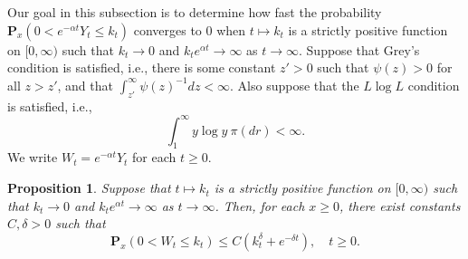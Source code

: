 \documentclass[12pt,a4paper]{amsart}
\theoremstyle{plain}
\newtheorem{prop}[thm]{Proposition}
\theoremstyle{definition}
\numberwithin{equation}{section}
\begin{document}
    Our goal in this subsection is to determine how fast the probability $\mathbf P_x(0<e^{-\alpha t}Y_t \leq k_t)$ converges to $0$
    when $t\mapsto k_t$ is a strictly positive function on $[0,\infty)$ such that $k_t \to 0$ and $k_t e^{\alpha t} \to \infty$ as $t\to \infty$.
    Suppose that Grey's condition is satisfied, i.e., there is some constant $z' > 0$ such that $\psi(z) > 0$ for all $z>z'$, and that $\int_{z'}^\infty \psi(z)^{-1}dz < \infty$.
    Also suppose that the $L \log L$ condition is satisfied, i.e.,
\[
    \int_1^\infty y \log y~\pi(dr)
    < \infty.
\]
    We write $W_t = e^{-\alpha t}Y_t$ for each $t\geq 0$.
\begin{prop}
\label{lem: control of XT}
    Suppose that $t\mapsto k_t$ is a strictly positive function on $[0,\infty)$ such that $k_t \to 0$ and $k_t e^{\alpha t} \to \infty$ as $t\to \infty$.
    Then, for each $x\geq 0$, there exist constants $C,\delta>0$ such that
\[
    \mathbf P_x(0<W_t\leq k_t)
    \leq C(k_t^\delta + e^{-\delta t}), \quad t\geq 0.
\]
\end{prop}
\end{document}
